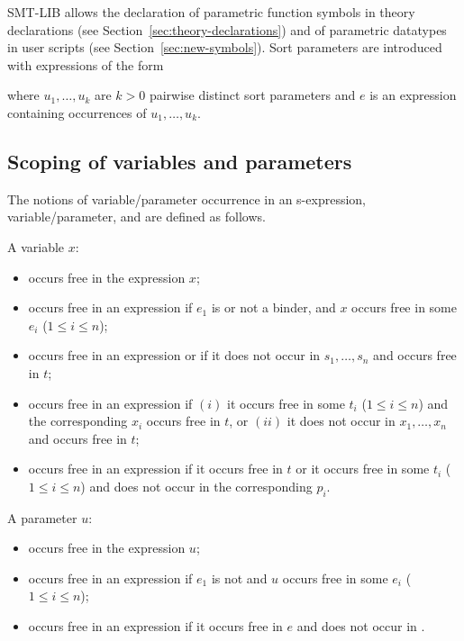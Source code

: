 SMT-LIB allows the declaration of parametric function symbols 
in theory declarations (see Section~\ref{sec:theory-declarations}) 
and of parametric datatypes in user scripts (see Section~\ref{sec:new-symbols}).
Sort parameters are introduced with expressions of the form
\begin{center}
\end{center}
where $u_1, \ldots, u_k$ are $k>0$ pairwise distinct sort parameters and
$e$ is an expression containing occurrences of $u_1, \ldots, u_k$.


\subsection{Scoping of variables and parameters} \label{sec:free}

The notions of  variable/parameter occurrence in an s-expression,
 variable/parameter, and
 are defined as follows.
\smallskip

\noindent A variable $x$:
\begin{itemize}
\item
occurs free in the expression $x$;
\item
occurs free in an expression 
if $e_1$ is  or not a binder, and 
$x$ occurs free in some $e_i$ ($1\le i\le n$); 
\item
occurs free in an expression 
 or
if it does not occur in $s_1, \ldots, s_n$ and occurs free in $t$;
\item
occurs free in an expression 
 if 
$(i)$ it occurs free in some $t_i$ ($1\le i\le n$) and 
the corresponding $x_i$ occurs free in $t$, or 
$(ii)$ it does not occur in $x_1, \ldots, x_n$ and occurs free in $t$;
\item
occurs free in an expression
if it occurs free in $t$ or it occurs free in some $t_i$ ($1\le i\le n$) and
does not occur in the corresponding $p_i$.
\end{itemize}

\noindent A parameter $u$:
\begin{itemize}
\item
occurs free in the expression $u$;
\item
occurs free in an expression 
if $e_1$ is not  and $u$ occurs free in some $e_i$ ($1\le i\le n$); 
\item
occurs free in an expression
if it occurs free in $e$ and does not occur in .
\end{itemize}

